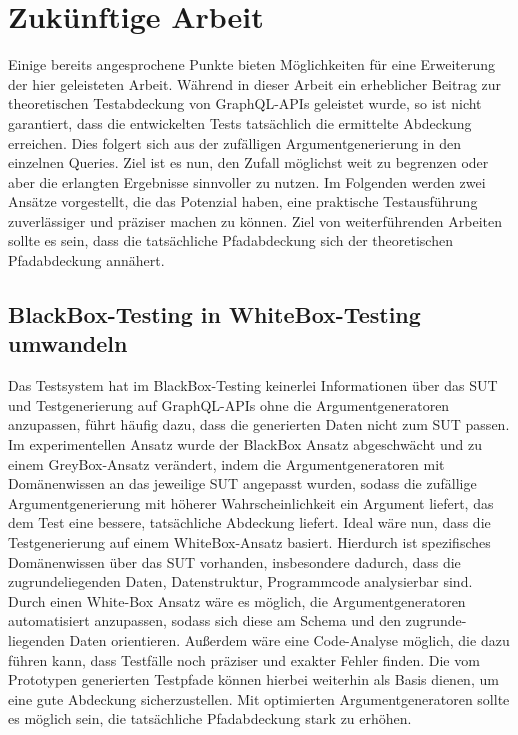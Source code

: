 \chapter{Zukünftige Arbeit}
\label{futurework}

Einige bereits angesprochene Punkte bieten Möglichkeiten für eine Erweiterung der hier geleisteten Arbeit.
Während in dieser Arbeit ein erheblicher Beitrag zur theoretischen Testabdeckung von GraphQL-APIs geleistet wurde,
so ist nicht garantiert, dass die entwickelten Tests tatsächlich die ermittelte Abdeckung erreichen.
Dies folgert sich aus der zufälligen Argumentgenerierung in den einzelnen Queries.
Ziel ist es nun, den Zufall möglichst weit zu begrenzen oder aber die erlangten Ergebnisse sinnvoller zu nutzen.
Im Folgenden werden zwei Ansätze vorgestellt, die das Potenzial haben, eine praktische Testausführung zuverlässiger und präziser machen zu können.
Ziel von weiterführenden Arbeiten sollte es sein, dass die tatsächliche Pfadabdeckung sich der theoretischen Pfadabdeckung annähert.

\section{BlackBox-Testing in WhiteBox-Testing umwandeln}

Das Testsystem hat im BlackBox-Testing keinerlei Informationen über das SUT und Testgenerierung auf GraphQL-APIs ohne die Argumentgeneratoren anzupassen,
führt häufig dazu, dass die generierten Daten nicht zum SUT passen.
Im experimentellen Ansatz wurde der BlackBox Ansatz abgeschwächt und zu einem GreyBox-Ansatz verändert, indem die Argumentgeneratoren mit Domänenwissen an das jeweilige SUT angepasst wurden,
sodass die zufällige Argumentgenerierung mit höherer Wahrscheinlichkeit ein Argument liefert, das dem Test eine bessere, tatsächliche Abdeckung liefert.
Ideal wäre nun, dass die Testgenerierung auf einem WhiteBox-Ansatz basiert.
Hierdurch ist spezifisches Domänenwissen über das SUT vorhanden, insbesondere dadurch, dass die zugrundeliegenden Daten, Datenstruktur, Programmcode analysierbar sind.
Durch einen White-Box Ansatz wäre es möglich, die Argumentgeneratoren automatisiert anzupassen, sodass sich diese am Schema und den zugrunde-liegenden Daten orientieren.
Außerdem wäre eine Code-Analyse möglich, die dazu führen kann, dass Testfälle noch präziser und exakter Fehler finden.
Die vom Prototypen generierten Testpfade können hierbei weiterhin als Basis dienen, um eine gute Abdeckung sicherzustellen.
Mit optimierten Argumentgeneratoren sollte es möglich sein, die tatsächliche Pfadabdeckung stark zu erhöhen.


